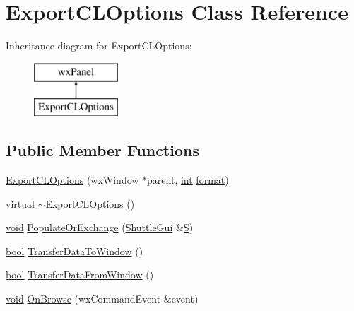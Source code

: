 \hypertarget{class_export_c_l_options}{}\section{Export\+C\+L\+Options Class Reference}
\label{class_export_c_l_options}
Inheritance diagram for Export\+C\+L\+Options\+:\begin{figure}[H]
\begin{center}
\leavevmode
\includegraphics[height=2.000000cm]{class_export_c_l_options}
\end{center}
\end{figure}
\subsection*{Public Member Functions}
\begin{DoxyCompactItemize}
\item 
\hyperlink{class_export_c_l_options_a655639233f03161359d3a3466c3d0e77}{Export\+C\+L\+Options} (wx\+Window $\ast$parent, \hyperlink{xmltok_8h_a5a0d4a5641ce434f1d23533f2b2e6653}{int} \hyperlink{_export_p_c_m_8cpp_a317afff57d87a89158c2b038d37b2b08}{format})
\item 
virtual \hyperlink{class_export_c_l_options_a34e77c4028c26b351d1177e09165882f}{$\sim$\+Export\+C\+L\+Options} ()
\item 
\hyperlink{sound_8c_ae35f5844602719cf66324f4de2a658b3}{void} \hyperlink{class_export_c_l_options_a2380f2bb0379b158a85c00c369fd7ae0}{Populate\+Or\+Exchange} (\hyperlink{class_shuttle_gui}{Shuttle\+Gui} \&\hyperlink{xlftab_8c_af933676109efed7ab34cea71d748a517}{S})
\item 
\hyperlink{mac_2config_2i386_2lib-src_2libsoxr_2soxr-config_8h_abb452686968e48b67397da5f97445f5b}{bool} \hyperlink{class_export_c_l_options_a507a26e5443f863ad5d0261888693643}{Transfer\+Data\+To\+Window} ()
\item 
\hyperlink{mac_2config_2i386_2lib-src_2libsoxr_2soxr-config_8h_abb452686968e48b67397da5f97445f5b}{bool} \hyperlink{class_export_c_l_options_a40ce4a1d11b68ea5523a0ef033748c67}{Transfer\+Data\+From\+Window} ()
\item 
\hyperlink{sound_8c_ae35f5844602719cf66324f4de2a658b3}{void} \hyperlink{class_export_c_l_options_a634b99c9174c873aabaef5c44272959e}{On\+Browse} (wx\+Command\+Event \&event)
\end{DoxyCompactItemize}


